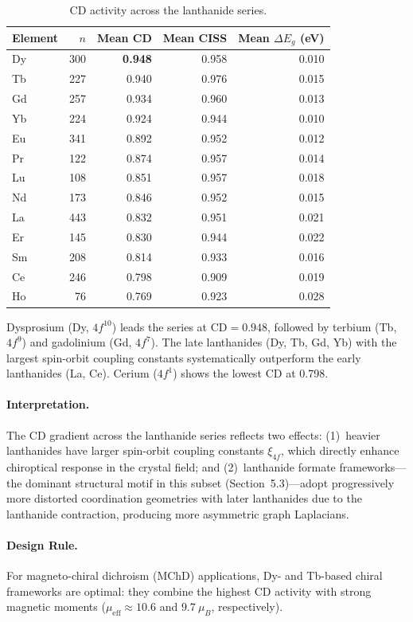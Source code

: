 \documentclass[11pt,a4paper]{article}
\begin{document}
\begin{table}[H]
\centering
\caption{CD activity across the lanthanide series.}
\label{tab:lanthanide}
\begin{tabular}{lrrrr}
\toprule
Element & $n$ & Mean CD & Mean CISS & Mean $\Delta E_g$ (eV) \\
\midrule
Dy & 300 & \textbf{0.948} & 0.958 & 0.010 \\
Tb & 227 & 0.940 & 0.976 & 0.015 \\
Gd & 257 & 0.934 & 0.960 & 0.013 \\
Yb & 224 & 0.924 & 0.944 & 0.010 \\
Eu & 341 & 0.892 & 0.952 & 0.012 \\
Pr & 122 & 0.874 & 0.957 & 0.014 \\
Lu & 108 & 0.851 & 0.957 & 0.018 \\
Nd & 173 & 0.846 & 0.952 & 0.015 \\
La & 443 & 0.832 & 0.951 & 0.021 \\
Er & 145 & 0.830 & 0.944 & 0.022 \\
Sm & 208 & 0.814 & 0.933 & 0.016 \\
Ce & 246 & 0.798 & 0.909 & 0.019 \\
Ho & 76 & 0.769 & 0.923 & 0.028 \\
\bottomrule
\end{tabular}
\end{table}

\noindent Dysprosium (Dy, $4f^{10}$) leads the series at $\text{CD} = 0.948$, followed by terbium (Tb, $4f^9$) and gadolinium (Gd, $4f^7$). The late lanthanides (Dy, Tb, Gd, Yb) with the largest spin-orbit coupling constants systematically outperform the early lanthanides (La, Ce). Cerium ($4f^1$) shows the lowest CD at 0.798.

\paragraph{Interpretation.} The CD gradient across the lanthanide series reflects two effects: (1)~heavier lanthanides have larger spin-orbit coupling constants $\xi_{4f}$, which directly enhance chiroptical response in the crystal field; and (2)~lanthanide formate frameworks---the dominant structural motif in this subset (Section~5.3)---adopt progressively more distorted coordination geometries with later lanthanides due to the lanthanide contraction, producing more asymmetric graph Laplacians.

\paragraph{Design Rule.} For magneto-chiral dichroism (MChD) applications, Dy- and Tb-based chiral frameworks are optimal: they combine the highest CD activity with strong magnetic moments ($\mu_{\text{eff}} \approx 10.6$ and $9.7~\mu_B$, respectively).
\end{document}
